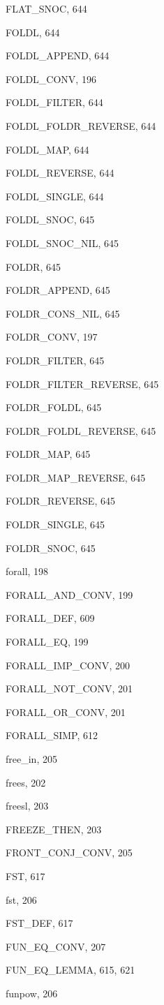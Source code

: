 \begin{theindex}
  \item {\ptt FLAT\_SNOC}, 644
  \item {\ptt FOLDL}, 644
  \item {\ptt FOLDL\_APPEND}, 644
  \item {\ptt FOLDL\_CONV}, 196
  \item {\ptt FOLDL\_FILTER}, 644
  \item {\ptt FOLDL\_FOLDR\_REVERSE}, 644
  \item {\ptt FOLDL\_MAP}, 644
  \item {\ptt FOLDL\_REVERSE}, 644
  \item {\ptt FOLDL\_SINGLE}, 644
  \item {\ptt FOLDL\_SNOC}, 645
  \item {\ptt FOLDL\_SNOC\_NIL}, 645
  \item {\ptt FOLDR}, 645
  \item {\ptt FOLDR\_APPEND}, 645
  \item {\ptt FOLDR\_CONS\_NIL}, 645
  \item {\ptt FOLDR\_CONV}, 197
  \item {\ptt FOLDR\_FILTER}, 645
  \item {\ptt FOLDR\_FILTER\_REVERSE}, 645
  \item {\ptt FOLDR\_FOLDL}, 645
  \item {\ptt FOLDR\_FOLDL\_REVERSE}, 645
  \item {\ptt FOLDR\_MAP}, 645
  \item {\ptt FOLDR\_MAP\_REVERSE}, 645
  \item {\ptt FOLDR\_REVERSE}, 645
  \item {\ptt FOLDR\_SINGLE}, 645
  \item {\ptt FOLDR\_SNOC}, 645
  \item {\ptt forall}, 198
  \item {\ptt FORALL\_AND\_CONV}, 199
  \item {\ptt FORALL\_DEF}, 609
  \item {\ptt FORALL\_EQ}, 199
  \item {\ptt FORALL\_IMP\_CONV}, 200
  \item {\ptt FORALL\_NOT\_CONV}, 201
  \item {\ptt FORALL\_OR\_CONV}, 201
  \item {\ptt FORALL\_SIMP}, 612
  \item {\ptt free\_in}, 205
  \item {\ptt frees}, 202
  \item {\ptt freesl}, 203
  \item {\ptt FREEZE\_THEN}, 203
  \item {\ptt FRONT\_CONJ\_CONV}, 205
  \item {\ptt FST}, 617
  \item {\ptt fst}, 206
  \item {\ptt FST\_DEF}, 617
  \item {\ptt FUN\_EQ\_CONV}, 207
  \item {\ptt FUN\_EQ\_LEMMA}, 615, 621
  \item {\ptt funpow}, 206


\end{theindex}
